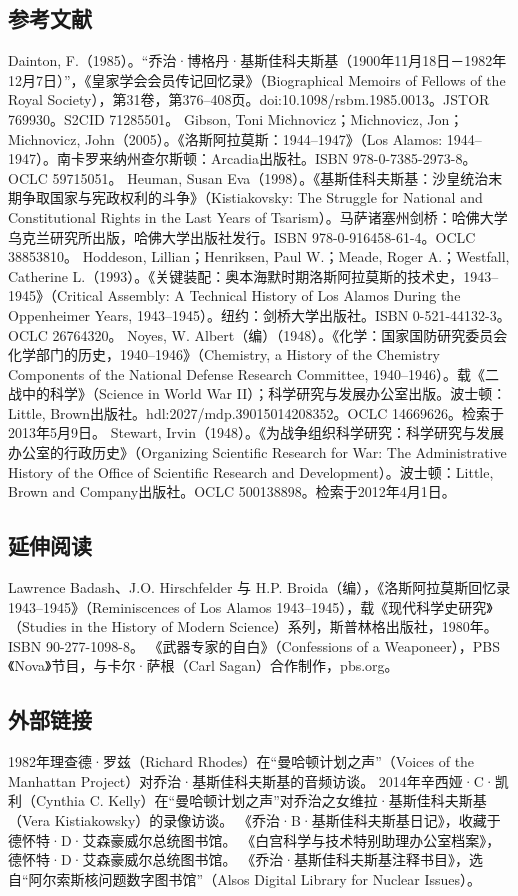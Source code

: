 \subsection{参考文献}
Dainton, F.（1985）。“乔治·博格丹·基斯佳科夫斯基（1900年11月18日－1982年12月7日）”，《皇家学会会员传记回忆录》（Biographical Memoirs of Fellows of the Royal Society），第31卷，第376–408页。doi:10.1098/rsbm.1985.0013。JSTOR 769930。S2CID 71285501。
Gibson, Toni Michnovicz；Michnovicz, Jon；Michnovicz, John（2005）。《洛斯阿拉莫斯：1944–1947》（Los Alamos: 1944–1947）。南卡罗来纳州查尔斯顿：Arcadia出版社。ISBN 978-0-7385-2973-8。OCLC 59715051。
Heuman, Susan Eva（1998）。《基斯佳科夫斯基：沙皇统治末期争取国家与宪政权利的斗争》（Kistiakovsky: The Struggle for National and Constitutional Rights in the Last Years of Tsarism）。马萨诸塞州剑桥：哈佛大学乌克兰研究所出版，哈佛大学出版社发行。ISBN 978-0-916458-61-4。OCLC 38853810。
Hoddeson, Lillian；Henriksen, Paul W.；Meade, Roger A.；Westfall, Catherine L.（1993）。《关键装配：奥本海默时期洛斯阿拉莫斯的技术史，1943–1945》（Critical Assembly: A Technical History of Los Alamos During the Oppenheimer Years, 1943–1945）。纽约：剑桥大学出版社。ISBN 0-521-44132-3。OCLC 26764320。
Noyes, W. Albert（编）（1948）。《化学：国家国防研究委员会化学部门的历史，1940–1946》（Chemistry, a History of the Chemistry Components of the National Defense Research Committee, 1940–1946）。载《二战中的科学》（Science in World War II）；科学研究与发展办公室出版。波士顿：Little, Brown出版社。hdl:2027/mdp.39015014208352。OCLC 14669626。检索于2013年5月9日。
Stewart, Irvin（1948）。《为战争组织科学研究：科学研究与发展办公室的行政历史》（Organizing Scientific Research for War: The Administrative History of the Office of Scientific Research and Development）。波士顿：Little, Brown and Company出版社。OCLC 500138898。检索于2012年4月1日。
\subsection{延伸阅读}
Lawrence Badash、J.O. Hirschfelder 与 H.P. Broida（编），《洛斯阿拉莫斯回忆录 1943–1945》（Reminiscences of Los Alamos 1943–1945），载《现代科学史研究》（Studies in the History of Modern Science）系列，斯普林格出版社，1980年。ISBN 90-277-1098-8。
《武器专家的自白》（Confessions of a Weaponeer），PBS《Nova》节目，与卡尔·萨根（Carl Sagan）合作制作，pbs.org。
\subsection{外部链接}
1982年理查德·罗兹（Richard Rhodes）在“曼哈顿计划之声”（Voices of the Manhattan Project）对乔治·基斯佳科夫斯基的音频访谈。
2014年辛西娅·C·凯利（Cynthia C. Kelly）在“曼哈顿计划之声”对乔治之女维拉·基斯佳科夫斯基（Vera Kistiakowsky）的录像访谈。
《乔治·B·基斯佳科夫斯基日记》，收藏于德怀特·D·艾森豪威尔总统图书馆。
《白宫科学与技术特别助理办公室档案》，德怀特·D·艾森豪威尔总统图书馆。
《乔治·基斯佳科夫斯基注释书目》，选自“阿尔索斯核问题数字图书馆”（Alsos Digital Library for Nuclear Issues）。
